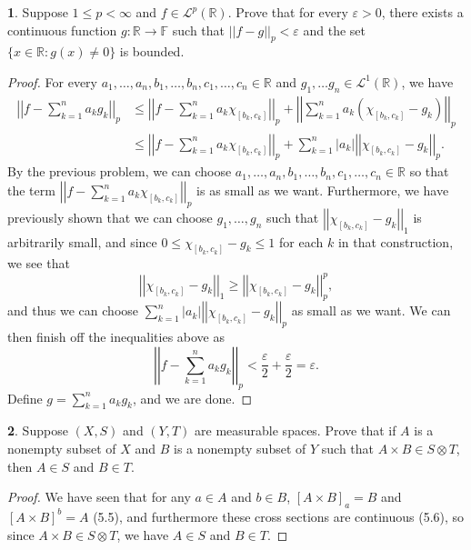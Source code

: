 \documentclass[12pt]{article}
\theoremstyle{definition}
\newtheorem{ex}{}
\newenvironment{exercise}[1]{
	\renewcommand{\theex}{#1}
	\begin{ex}
		}{\end{ex}}
\begin{document}
\begin{exercise}{7A.19}
	Suppose $1 \leq p < \infty$ and $f \in \mathcal{L}^p(\mathbb{R})$.
	Prove that for every $\varepsilon > 0$, there exists a continuous function $g: \mathbb{R} \to \mathbb{F}$ such that $||f-g||_p < \varepsilon$ and the set $\lbrace x \in \mathbb{R} : g(x) \neq 0 \rbrace$ is bounded.
\end{exercise}
\begin{proof}
	For every $a_1, \dots, a_n, b_1, \dots, b_n, c_1, \dots, c_n \in \mathbb{R}$ and $g_1, \dots g_n \in \mathcal{L}^1(\mathbb{R})$, we have \begin{align*}
		\left| \left| f-\sum_{k=1}^n a_kg_k \right| \right|_p & \leq \left| \left| f-\sum_{k=1}^n a_k \chi_{[b_k,c_k]} \right| \right|_p + \left| \left| \sum_{k=1}^n a_k (\chi_{[b_k,c_k]} - g_k)\right| \right|_p  \\
		                                                      & \leq \left| \left| f-\sum_{k=1}^n a_k \chi_{[b_k,c_k]} \right| \right|_p + \sum_{k=1}^n  |a_k|\left| \left| \chi_{[b_k,c_k]} - g_k\right| \right|_p.
	\end{align*}
	By the previous problem, we can choose $a_1, \dots, a_n, b_1, \dots, b_n, c_1, \dots, c_n \in \mathbb{R}$ so that the term $\left| \left| f-\sum_{k=1}^n a_k \chi_{[b_k,c_k]} \right| \right|_p$ is as small as we want.
	Furthermore, we have previously shown that we can choose $g_1, \dots, g_n$ such that $\left| \left| \chi_{[b_k,c_k]} - g_k\right| \right|_1$ is arbitrarily small, and since $0 \leq \chi_{[b_k, c_k]} - g_k \leq 1$ for each $k$ in that construction, we see that \begin{equation*}
		\left|\left|\chi_{[b_k, c_k]} - g_k\right|\right|_1 \geq \left|\left|\chi_{[b_k, c_k]} - g_k\right|\right|_p^p,
	\end{equation*}
	and thus we can choose $\sum_{k=1}^n  |a_k|\left| \left| \chi_{[b_k,c_k]} - g_k\right| \right|_p$ as small as we want.
	We can then finish off the inequalities above as
	\begin{equation*}
		\left| \left| f-\sum_{k=1}^n a_kg_k \right| \right|_p < \frac{\varepsilon}{2} + \frac{\varepsilon}{2} = \varepsilon.
	\end{equation*}
  Define $g = \sum_{k=1}^n a_kg_k$, and we are done.
\end{proof}

\begin{exercise}{5A.1}
	Suppose $(X, S)$ and $(Y, T)$ are measurable spaces.
	Prove that if $A$ is a nonempty subset of $X$ and $B$ is a nonempty subset of $Y$ such that $A \times B \in S \otimes T$, then $A \in S$ and $B \in T$.
\end{exercise}
\begin{proof}
	We have seen that for any $a \in A$ and $b \in B$, $[A \times B]_a = B$ and $[A \times B]^b = A$ (5.5), and furthermore these cross sections are continuous (5.6), so since $A \times B \in S \otimes T$, we have $A \in S$ and $B \in T$.
\end{proof}
\end{document}
